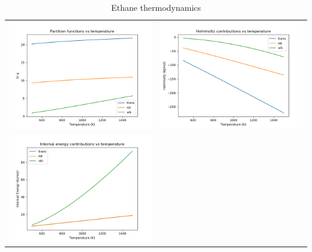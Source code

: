 \documentclass[11pt]{article}
\begin{document}
\begin{table}
   \caption{Ethane thermodynamics}
\begin{tabular}{cc}
\includegraphics[scale=0.5]{./Images/ethane-partition.png} & \includegraphics[scale=0.5]{./Images/ethane-helmholtz.png} \\
\includegraphics[scale=0.5]{./Images/ethane-energy.png} & 

\end{tabular}
\end{table}
\end{document}

